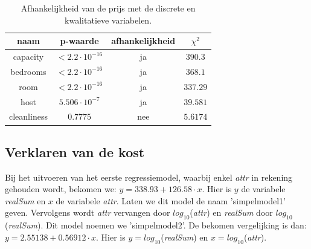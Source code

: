\documentclass[a4paper]{kulakarticle}
\begin{document}
	\begin{table}[h]
		\centering
		\begin{tabular}{c|c|c|c }
			naam & p-waarde & afhankelijkheid & $\chi ^2$\\
			\hline
			\hline
			capacity &$ < 2.2\cdot 10^{-16}$& ja& $390.3$ \\ 
			bedrooms &$ < 2.2\cdot 10^{-16}$& ja&$368.1 $ \\
			room &$ < 2.2\cdot 10^{-16}$& ja&$ 337.29$ \\
			host &$ 5.506\cdot 10^{-7}$& ja&$39.581 $ \\
			cleanliness & $0.7775$&nee& $5.6174$ \\
		\end{tabular}
		\caption{Afhankelijkheid van de prijs met de discrete en kwalitatieve variabelen.}
		\label{discrete variabelen afhankelijkheid}
	\end{table}
	
	\subsection{Verklaren van de kost}
	
	Bij het uitvoeren van het eerste regressiemodel, waarbij enkel \textit{attr} in rekening gehouden wordt, bekomen we: 
    $ y = 338.93 + 126.58\cdot x$. Hier is $y$ de variabele \textit{realSum} en $x$ de variabele \textit{attr}. Laten we dit model de naam 'simpelmodel1' geven. Vervolgens wordt \textit{attr} vervangen door $log_{10}$(\textit{attr}) en \textit{realSum} door $log_{10}$(\textit{realSum}). Dit model noemen we 'simpelmodel2'. De bekomen vergelijking is dan: $ y = 2.55138 + 0.56912\cdot x$. Hier is $y = log_{10}$(\textit{realSum}) en $x = log_{10}$(\textit{attr}).\\
	
\end{document}
